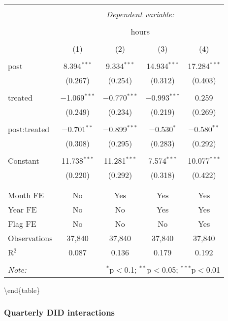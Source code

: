 \documentclass[11pt,]{article}
\begin{document}
\begin{tabular}{@{\extracolsep{5pt}}lcccc} 
\\[-1.8ex]\hline 
\hline \\[-1.8ex] 
 & \multicolumn{4}{c}{\textit{Dependent variable:}} \\ 
\cline{2-5} 
\\[-1.8ex] & \multicolumn{4}{c}{hours} \\ 
\\[-1.8ex] & (1) & (2) & (3) & (4)\\ 
\hline \\[-1.8ex] 
 post & 8.394$^{***}$ & 9.334$^{***}$ & 14.934$^{***}$ & 17.284$^{***}$ \\ 
  & (0.267) & (0.254) & (0.312) & (0.403) \\ 
  & & & & \\ 
 treated & $-$1.069$^{***}$ & $-$0.770$^{***}$ & $-$0.993$^{***}$ & 0.259 \\ 
  & (0.249) & (0.234) & (0.219) & (0.269) \\ 
  & & & & \\ 
 post:treated & $-$0.701$^{**}$ & $-$0.899$^{***}$ & $-$0.530$^{*}$ & $-$0.580$^{**}$ \\ 
  & (0.308) & (0.295) & (0.283) & (0.292) \\ 
  & & & & \\ 
 Constant & 11.738$^{***}$ & 11.281$^{***}$ & 7.574$^{***}$ & 10.077$^{***}$ \\ 
  & (0.220) & (0.292) & (0.318) & (0.422) \\ 
  & & & & \\ 
\hline \\[-1.8ex] 
Month FE & No & Yes & Yes & Yes \\ 
Year FE & No & No & Yes & Yes \\ 
Flag FE & No & No & No & Yes \\ 
Observations & 37,840 & 37,840 & 37,840 & 37,840 \\ 
R$^{2}$ & 0.087 & 0.136 & 0.179 & 0.192 \\ 
\hline 
\hline \\[-1.8ex] 
\textit{Note:}  & \multicolumn{4}{r}{$^{*}$p$<$0.1; $^{**}$p$<$0.05; $^{***}$p$<$0.01} \\ 
\end{tabular}

\textbackslash{}end\{table\}

\clearpage

\hypertarget{quarterly-did-interactions}{%
\subsubsection{Quarterly DID
interactions}\label{quarterly-did-interactions}}
\end{document}
